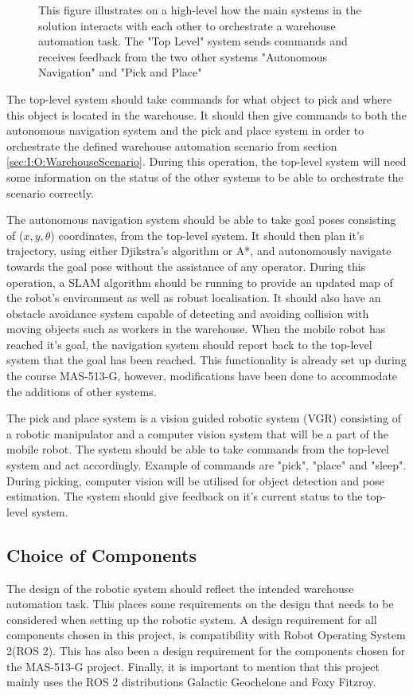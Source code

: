 \begin{figure}[htp!]
    \fontsize{9}{14}\selectfont
    \centering
    
    \caption{This figure illustrates on a high-level how the main systems in the solution interacts with each other to orchestrate a warehouse automation task. The "Top Level" system sends commands and receives feedback from the two other systems "Autonomous Navigation" and "Pick and Place"}
    \label{fig:M:CD:topLevelMethod}
\end{figure}

The top-level system should take commands for what object to pick and where this object is located in the warehouse. It should then give commands to both the autonomous navigation system and the pick and place system in order to orchestrate the defined warehouse automation scenario from section \ref{sec:I:O:WarehouseScenario}. During this operation, the top-level system will need some information on the status of the other systems to be able to orchestrate the scenario correctly.

The autonomous navigation system should be able to take goal poses consisting of ($x,y,\theta$) coordinates, from the top-level system. It should then plan it's trajectory, using either Djikstra's algorithm or A*, and autonomously navigate towards the goal pose without the assistance of any operator. During this operation, a SLAM algorithm should be running to provide an updated map of the robot's environment as well as robust localisation. It should also have an obstacle avoidance system capable of detecting and avoiding collision with moving objects such as workers in the warehouse. When the mobile robot has reached it's goal, the navigation system should report back to the top-level system that the goal has been reached. This functionality is already set up during the course MAS-513-G, however, modifications have been done to accommodate the additions of other systems.

The pick and place system is a vision guided robotic system (VGR) consisting of a robotic manipulator and a computer vision system that will be a part of the mobile robot. The system should be able to take commands from the top-level system and act accordingly. Example of commands are "pick", "place" and "sleep". During picking, computer vision will be utilised for object detection and pose estimation. The system should give feedback on it's current status to the top-level system.

\subsection{Choice of Components} \label{sec:M:CD:ChoiceOfComponents}
The design of the robotic system should reflect the intended warehouse automation task. This places some requirements on the design that needs to be considered when setting up the robotic system. A design requirement for all components chosen in this project, is compatibility with Robot Operating System 2(ROS 2). This has also been a design requirement for the components chosen for the MAS-513-G project. Finally, it is important to mention that this project mainly uses the ROS 2 distributions Galactic Geochelone and Foxy Fitzroy.

